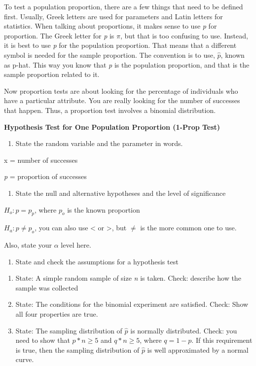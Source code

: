 \documentclass[]{book}
\providecommand{\tightlist}{%
  \setlength{\itemsep}{0pt}\setlength{\parskip}{0pt}}
\begin{document}
To test a population proportion, there are a few things that need to be defined first. Usually, Greek letters are used for parameters and Latin letters for statistics. When talking about proportions, it makes sense to use \emph{p} for proportion. The Greek letter for \emph{p} is \(\pi\), but that is too confusing to use. Instead, it is best to use \emph{p} for the population proportion. That means that a different symbol is needed for the sample proportion. The convention is to use, \(\hat{p}\), known as p-hat. This way you know that \emph{p} is the population proportion, and that is the sample proportion related to it.

Now proportion tests are about looking for the percentage of individuals who have a particular attribute. You are really looking for the number of successes that happen. Thus, a proportion test involves a binomial distribution.

\textbf{Hypothesis Test for One Population Proportion (1-Prop Test)}

\begin{enumerate}
\def\labelenumi{\arabic{enumi}.}
\tightlist
\item
  State the random variable and the parameter in words.
\end{enumerate}

x = number of successes

\emph{p} = proportion of successes

\begin{enumerate}
\def\labelenumi{\arabic{enumi}.}
\setcounter{enumi}{1}
\tightlist
\item
  State the null and alternative hypotheses and the level of
  significance
\end{enumerate}

\(H_o:p=p_p\), where \(p_o\) is the known proportion

\(H_a:p\ne p_o\), you can also use \textless{} or \textgreater{}, but \(\ne\) is the more common one to use.

Also, state your \(\alpha\) level here.

\begin{enumerate}
\def\labelenumi{\arabic{enumi}.}
\setcounter{enumi}{2}
\tightlist
\item
  State and check the assumptions for a hypothesis test
\end{enumerate}

\begin{enumerate}
\def\labelenumi{\alph{enumi}.}
\item
  State: A simple random sample of size \emph{n} is taken. Check: describe how the sample was collected
\item
  State: The conditions for the binomial experiment are satisfied. Check: Show all four properties are true.
\item
  State: The sampling distribution of \(\hat{p}\) is normally distributed. Check: you need to show that \(p*n\ge5\) and \(q*n\ge5\), where \(q=1-p\). If this requirement is true, then the sampling distribution of \(\hat{p}\) is well approximated by a normal curve.
\end{enumerate}
\end{document}
